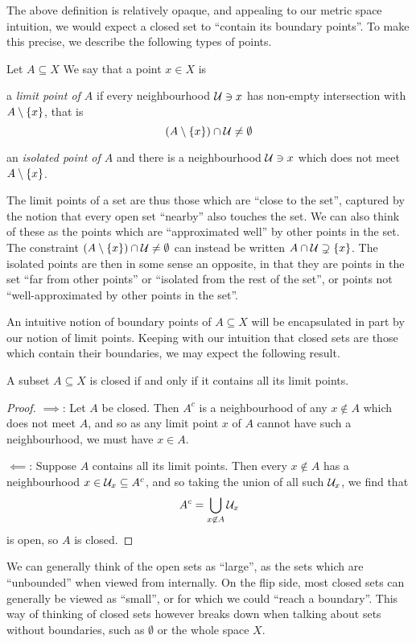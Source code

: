 \documentclass[11pt]{article}
\begin{document}
The above definition is relatively opaque, and appealing to our metric space intuition, we would expect a closed set to ``contain its boundary points''. To make this precise, we describe the following types of points.
\begin{definition}
    Let $A \subseteq X$ We say that a point $x \in X$ is
    \begin{enum}
        \item a \emph{limit point of $A$} if every neighbourhood $\mathcal{U} \ni x$ has non-empty intersection with $A \setminus \left\{  x  \right\}$, that is 
        $$
            (A \setminus \left\{  x  \right\}) \cap \mathcal{U} \neq \emptyset
        $$
        \item an \emph{isolated point of $A$} and there is a neighbourhood $\mathcal{U} \ni x$ which does not meet $A \setminus \left\{  x  \right\}$.
    \end{enum}
\end{definition}
The limit points of a set are thus those which are ``close to the set'', captured by the notion that every open set ``nearby'' also touches the set. We can also think of these as the points which are ``approximated well'' by other points in the set. The constraint $(A \setminus \left\{  x  \right\}) \cap \mathcal{U} \neq \emptyset$ can instead be written $A \cap \mathcal{U} \supsetneq \left\{  x  \right\}$. The isolated points are then in some sense an opposite, in that they are points in the set ``far from other points'' or ``isolated from the rest of the set'', or points not ``well-approximated by other points in the set''.

An intuitive notion of boundary points of $A \subseteq X$ will be encapsulated in part by our notion of limit points. Keeping with our intuition that closed sets are those which contain their boundaries, we may expect the following result.
\begin{proposition}
    A subset $A \subseteq X$ is closed if and only if it contains all its limit points.
\end{proposition}
\begin{proof}
    $\implies$: Let $A$ be closed. Then $A^c$ is a neighbourhood of any $x \not\in A$ which does not meet $A$, and so as any limit point $x$ of $A$ cannot have such a neighbourhood, we must have $x \in A$.

    $\impliedby$: Suppose $A$ contains all its limit points. Then every $x \not\in A$ has a neighbourhood $x \in \mathcal{U}_x \subseteq A^c$, and so taking the union of all such $\mathcal{U}_x$, we find that
    $$
        A^c = \bigcup_{x \not\in A}\mathcal{U}_x
    $$
    is open, so $A$ is closed.
\end{proof}
We can generally think of the open sets as ``large'', as the sets which are ``unbounded'' when viewed from internally. On the flip side, most closed sets can generally be viewed as ``small'', or for which we could ``reach a boundary''. This way of thinking of closed sets however breaks down when talking about sets without boundaries, such as $\emptyset$ or the whole space $X$.
\end{document}

